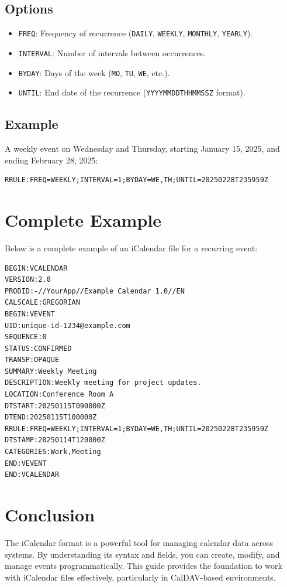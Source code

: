 \documentclass[a4paper,12pt]{article}
\begin{document}
\subsection{Options}
\begin{itemize}
    \item \texttt{FREQ}: Frequency of recurrence (\texttt{DAILY}, \texttt{WEEKLY}, \texttt{MONTHLY}, \texttt{YEARLY}).
    \item \texttt{INTERVAL}: Number of intervals between occurrences.
    \item \texttt{BYDAY}: Days of the week (\texttt{MO}, \texttt{TU}, \texttt{WE}, etc.).
    \item \texttt{UNTIL}: End date of the recurrence (\texttt{YYYYMMDDTHHMMSSZ} format).
\end{itemize}

\subsection{Example}
A weekly event on Wednesday and Thursday, starting January 15, 2025, and ending February 28, 2025:
\begin{verbatim}
RRULE:FREQ=WEEKLY;INTERVAL=1;BYDAY=WE,TH;UNTIL=20250228T235959Z
\end{verbatim}

\section{Complete Example}
Below is a complete example of an iCalendar file for a recurring event:
\begin{verbatim}
BEGIN:VCALENDAR
VERSION:2.0
PRODID:-//YourApp//Example Calendar 1.0//EN
CALSCALE:GREGORIAN
BEGIN:VEVENT
UID:unique-id-1234@example.com
SEQUENCE:0
STATUS:CONFIRMED
TRANSP:OPAQUE
SUMMARY:Weekly Meeting
DESCRIPTION:Weekly meeting for project updates.
LOCATION:Conference Room A
DTSTART:20250115T090000Z
DTEND:20250115T100000Z
RRULE:FREQ=WEEKLY;INTERVAL=1;BYDAY=WE,TH;UNTIL=20250228T235959Z
DTSTAMP:20250114T120000Z
CATEGORIES:Work,Meeting
END:VEVENT
END:VCALENDAR
\end{verbatim}

\section{Conclusion}
The iCalendar format is a powerful tool for managing calendar data across systems. By understanding its syntax and fields, you can create, modify, and manage events programmatically. This guide provides the foundation to work with iCalendar files effectively, particularly in CalDAV-based environments.
\end{document}

